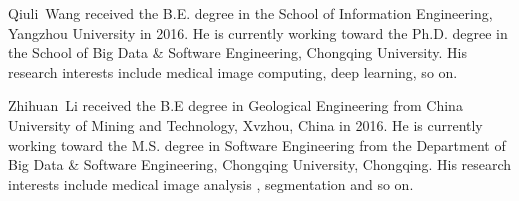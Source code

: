 \documentclass[journal]{IEEEtran}
\begin{document}
% 




\newpage

\begin{IEEEbiography}{Qiuli~Wang}
    received the B.E. degree in the School of Information Engineering, Yangzhou University in 2016. He is currently working toward the Ph.D. degree in the School of Big Data \& Software Engineering, Chongqing University. 
    His research interests include medical image computing, deep learning, so on.
\end{IEEEbiography}

\vspace{-0.5cm}

\begin{IEEEbiography}{Zhihuan~Li}
    received the B.E degree in Geological Engineering from China University of Mining and Technology, Xvzhou, China in 2016. He is currently working toward the M.S. degree in Software Engineering from the Department of Big Data \& Software Engineering, Chongqing University, Chongqing.
	His research interests include medical image analysis , segmentation and so on.
\end{IEEEbiography}
\end{document}
